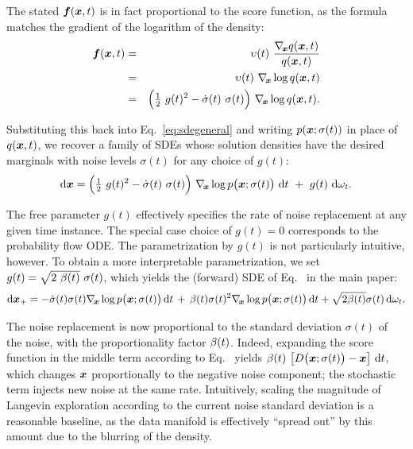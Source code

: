 The stated $\boldsymbol{f}(\boldsymbol{x},t)$ is in fact proportional to the score function, as the formula matches the gradient of the logarithm of the density:
\begin{eqnarray}
  \boldsymbol{f}(\boldsymbol{x}, t) &=& \upsilon(t) ~\frac{\nabla_{\hspace{-0.5mm}\boldsymbol{x}} q(\boldsymbol{x},t)}{q(\boldsymbol{x},t)} \\
  &=& \upsilon(t) ~\nabla_{\hspace{-0.5mm}\boldsymbol{x}} \log q(\boldsymbol{x}, t) \\
  &=& \Big( \tfrac{1}{2} ~g(t)^2 - \dot\sigma(t) ~\sigma(t) \Big) ~\nabla_{\hspace{-0.5mm}\boldsymbol{x}} \log q(\boldsymbol{x}, t)
  \text{.}
\end{eqnarray}

Substituting this back into Eq.~\ref{eq:sdegeneral} and writing $p(\boldsymbol{x}; \sigma(t))$ in place of $q(\boldsymbol{x},t)$, we recover a family of SDEs whose solution densities have the desired marginals with noise levels $\sigma(t)$ for any choice of $g(t)$:
\begin{equation}
  \mathrm{d} \boldsymbol{x} = \Big( \tfrac{1}{2} ~g(t)^2 - \dot\sigma(t) ~\sigma(t) \Big) ~\nabla_{\hspace{-0.5mm}\boldsymbol{x}} \log p\big( \boldsymbol{x}; \sigma(t) \big) ~\mathrm{d} t ~+~ g(t) ~\mathrm{d}\omega_t
  \text{.}
\end{equation}

The free parameter $g(t)$ effectively specifies the rate of noise replacement at any given time instance. The special case choice of $g(t) = 0$ corresponds to the probability flow ODE. The parametrization by $g(t)$ is not particularly intuitive, however. To obtain a more interpretable parametrization, we set $g(t) = \sqrt{2 ~\beta(t)} ~\sigma(t)$, which yields the (forward) SDE of Eq.~ in the main paper:
\begin{equation}
  \mathrm{d} \boldsymbol{x}_{+} =
    -\dot\sigma(t) \sigma(t) \nabla_{\hspace{-0.5mm}\boldsymbol{x}} \log p\big( \boldsymbol{x}; \sigma(t) \big) \,\mathrm{d}t\, + \,
      \beta(t) \sigma(t)^2 \nabla_{\hspace{-0.5mm}\boldsymbol{x}} \log p\big( \boldsymbol{x}; \sigma(t) \big) \,\mathrm{d}t +
      \sqrt{2 \beta(t)} \sigma(t) \,\mathrm{d}\omega_t
  \label{eq:sdeforward}
  \text{.}
\end{equation}

The noise replacement is now proportional to the standard deviation $\sigma(t)$ of the noise, with the proportionality factor $\beta(t)$. Indeed, expanding the score function in the middle term according to Eq.~ yields $\beta(t) ~\big[ D\big( \boldsymbol{x};\sigma(t) \big) - \boldsymbol{x} \big] ~\mathrm{d} t$, which changes $\boldsymbol{x}$ proportionally to the negative noise component; the stochastic term injects new noise at the same rate. Intuitively, scaling the magnitude of Langevin exploration according to the current noise standard deviation is a reasonable baseline, as the data manifold is effectively ``spread out'' by this amount due to the blurring of the density.

